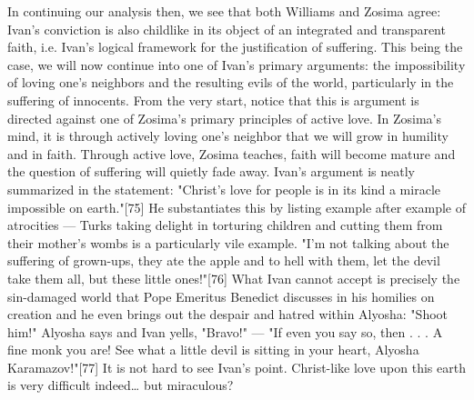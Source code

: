 In continuing our analysis then, we see that both Williams and Zosima agree: Ivan's conviction is also childlike in its object of an integrated and transparent faith, i.e. Ivan's logical framework for the justification of suffering. This being the case, we will now continue into one of Ivan's primary arguments: the impossibility of loving one's neighbors and the resulting evils of the world, particularly in the suffering of innocents. From the very start, notice that this is argument is directed against one of Zosima's primary principles of active love. In Zosima's mind, it is through actively loving one's neighbor that we will grow in humility and in faith. Through active love, Zosima teaches, faith will become mature and the question of suffering will quietly fade away. Ivan's argument is neatly summarized in the statement: "Christ's love for people is in its kind a miracle impossible on earth."[75] He substantiates this by listing example after example of atrocities — Turks taking delight in torturing children and cutting them from their mother's wombs is a particularly vile example. "I'm not talking about the suffering of grown-ups, they ate the apple and to hell with them, let the devil take them all, but these little ones!"[76] What Ivan cannot accept is precisely the sin-damaged world that Pope Emeritus Benedict discusses in his homilies on creation and he even brings out the despair and hatred within Alyosha: "Shoot him!" Alyosha says and Ivan yells, "Bravo!" — "If even you say so, then . . . A fine monk you are! See what a little devil is sitting in your heart, Alyosha Karamazov!"[77] It is not hard to see Ivan's point. Christ-like love upon this earth is very difficult indeed… but miraculous?
